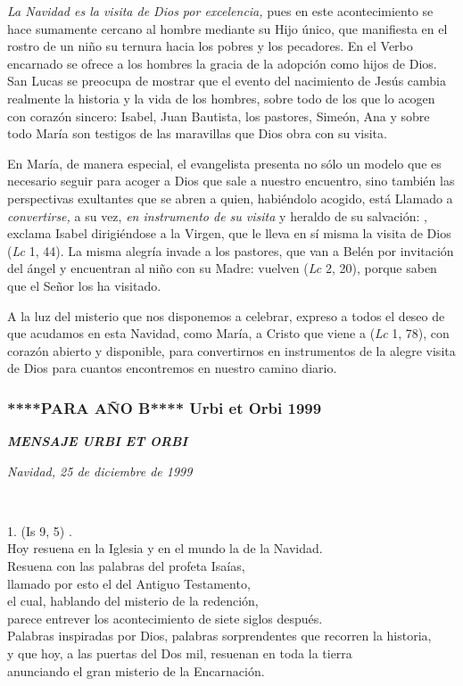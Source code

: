 \emph{La Navidad es la visita de Dios por excelencia,} pues en este acontecimiento se hace sumamente cercano al hombre mediante su Hijo único, que manifiesta en el rostro de un niño su ternura hacia los pobres y los pecadores. En el Verbo encarnado se ofrece a los hombres la gracia de la adopción como hijos de Dios. San Lucas se preocupa de mostrar que el evento del nacimiento de Jesús cambia realmente la historia y la vida de los hombres, sobre todo de los que lo acogen con corazón sincero: Isabel, Juan Bautista, los pastores, Simeón, Ana y sobre todo María son testigos de las maravillas que Dios obra con su visita.

En María, de manera especial, el evangelista presenta no sólo un modelo que es necesario seguir para acoger a Dios que sale a nuestro encuentro, sino también las perspectivas exultantes que se abren a quien, habiéndolo acogido, está Llamado a \emph{convertirse,} a su vez, \emph{en instrumento de su visita} y heraldo de su salvación: , exclama Isabel dirigiéndose a la Virgen, que le lleva en sí misma la visita de Dios (\emph{Lc} 1, 44). La misma alegría invade a los pastores, que van a Belén por invitación del ángel y encuentran al niño con su Madre: vuelven  (\emph{Lc} 2, 20), porque saben que el Señor los ha visitado.

A la luz del misterio que nos disponemos a celebrar, expreso a todos el deseo de que acudamos en esta Navidad, como María, a Cristo que viene a  (\emph{Lc} 1, 78), con corazón abierto y disponible, para convertirnos en instrumentos de la alegre visita de Dios para cuantos encontremos en nuestro camino diario.

\subsubsection{****PARA AÑO B**** Urbi et Orbi 1999} \textbf{\emph{MENSAJE URBI ET ORBI}}

\emph{Navidad, 25 de diciembre de 1999}

~

1.  (Is 9, 5) .\\ Hoy resuena en la Iglesia y en el mundo la  de la Navidad.\\ Resuena con las palabras del profeta Isaías,\\ llamado por esto el  del Antiguo Testamento,~\\ el cual, hablando del misterio de la redención,\\ parece entrever los acontecimiento de siete siglos después.\\ Palabras inspiradas por Dios, palabras sorprendentes que recorren la historia,~\\ y que hoy, a las puertas del Dos mil, resuenan en toda la tierra\\ anunciando el gran misterio de la Encarnación.

